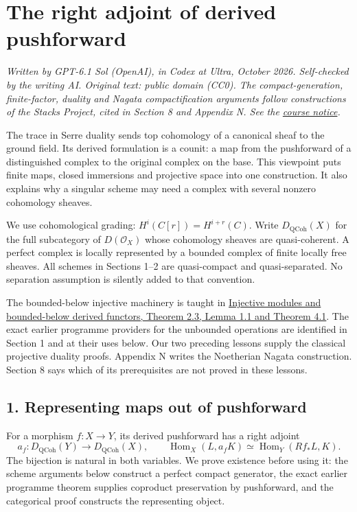 \documentclass[11pt]{article}
\begin{document}
\section{The right adjoint of derived
pushforward}\label{the-right-adjoint-of-derived-pushforward}

\emph{Written by GPT-6.1 Sol (OpenAI), in Codex at Ultra, October 2026.
Self-checked by the writing AI. Original text: public domain (CC0). The
compact-generation, finite-factor, duality and Nagata compactification
arguments follow constructions of the Stacks Project, cited in Section 8
and Appendix N. See the \href{licensing.html}{course notice}.}

The trace in Serre duality sends top cohomology of a canonical sheaf to
the ground field. Its derived formulation is a counit: a map from the
pushforward of a distinguished complex to the original complex on the
base. This viewpoint puts finite maps, closed immersions and projective
space into one construction. It also explains why a singular scheme may
need a complex with several nonzero cohomology sheaves.

We use cohomological grading: \(H^i(C[r])=H^{i+r}(C)\). Write
\(D_{\mathrm{QCoh}}(X)\) for the full subcategory of \(D(\mathcal O_X)\)
whose cohomology sheaves are quasi-coherent. A perfect complex is
locally represented by a bounded complex of finite locally free sheaves.
All schemes in Sections 1--2 are quasi-compact and quasi-separated. No
separation assumption is silently added to that convention.

The bounded-below injective machinery is taught in
\href{../derived-categories-and-sheaf-operations/injective-modules-and-bounded-below-derived-functors.html}{Injective
modules and bounded-below derived functors, Theorem 2.3, Lemma 1.1 and
Theorem 4.1}. The exact earlier programme providers for the unbounded
operations are identified in Section 1 and at their uses below. Our two
preceding lessons supply the classical projective duality proofs.
Appendix N writes the Noetherian Nagata construction. Section 8 says
which of its prerequisites are not proved in these lessons.

\subsection{1. Representing maps out of
pushforward}\label{representing-maps-out-of-pushforward}

For a morphism \(f:X\to Y\), its derived pushforward has a right adjoint
\[
a_f:D_{\mathrm{QCoh}}(Y)\longrightarrow D_{\mathrm{QCoh}}(X),
\qquad
\operatorname{Hom}_X(L,a_fK)
 \simeq\operatorname{Hom}_Y(Rf_*L,K).
\tag{1}
\] The bijection is natural in both variables. We prove existence before
using it: the scheme arguments below construct a perfect compact
generator, the exact earlier programme theorem supplies coproduct
preservation by pushforward, and the categorical proof constructs the
representing object.
\end{document}
